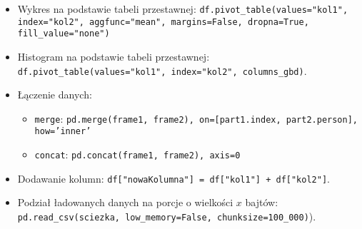 \documentclass[11pt]{report}
\begin{document}
\begin{itemize}
    \item Wykres na podstawie tabeli przestawnej: \texttt{df.pivot\_table(values="kol1", index="kol2", aggfunc="mean", margins=False, dropna=True, fill\_value="{}none")}
    \item Histogram na podstawie tabeli przestawnej: \texttt{df.pivot\_table(values="kol1", index="kol2", columns\_gbd)}.
    \item Łączenie danych: 
    \begin{itemize}
        \item  \texttt{merge}: \texttt{pd.merge(frame1, frame2), on=[part1.index, part2.person], how='inner'}
        \item \texttt{concat}: \texttt{pd.concat(frame1, frame2), axis=0}
    \end{itemize}
    \item Dodawanie kolumn: \texttt{df["{}nowaKolumna"] = df["kol1"] + df["kol2"]}.
    \item Podział ładowanych danych na porcje o wielkości $x$ bajtów: \texttt{pd.read\_csv(sciezka, low\_memory=False, chunksize=100\_000)}). 
\end{itemize}
\end{document}
